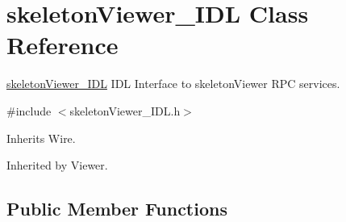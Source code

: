 \section{skeleton\+Viewer\+\_\+\+I\+DL Class Reference}
\label{classskeletonViewer__IDL}


\mbox{\hyperlink{classskeletonViewer__IDL}{skeleton\+Viewer\+\_\+\+I\+DL}} I\+DL Interface to skeleton\+Viewer R\+PC services.  




{\ttfamily \#include $<$skeleton\+Viewer\+\_\+\+I\+D\+L.\+h$>$}



Inherits Wire.



Inherited by Viewer.

\subsection*{Public Member Functions}
